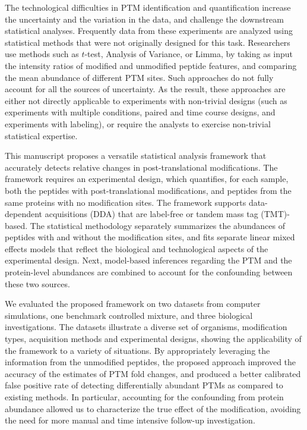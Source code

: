 \documentclass[mcp]{article}
\numberwithin{table}{section}
\begin{document}
The technological difficulties in PTM identification and quantification increase the uncertainty and the variation in the data, and challenge the downstream statistical analyses. Frequently data from these experiments are analyzed using statistical methods that were not originally designed for this task. Researchers use methods such as $t$-test\cite{Kalpic:2011}, Analysis of Variance\cite{girden:1992}, or Limma\cite{Ritchie_15a}, by taking as input the intensity ratios of modified and unmodified peptide features, and comparing the mean abundance of different PTM sites. Such approaches do not fully account for all the sources of uncertainty. As the result, these approaches are either not directly applicable to experiments with non-trivial designs (such as experiments with multiple conditions, paired and time course designs, and experiments with labeling), or require the analysts to exercise non-trivial statistical expertise.

This manuscript proposes a versatile statistical analysis framework that accurately detects relative changes in post-translational modifications. The framework requires an experimental design, which quantifies, for each sample, both the peptides with post-translational modifications, and peptides from the same proteins with no modification sites. The framework supports data-dependent acquisitions (DDA) that are label-free or tandem mass tag (TMT)-based. The statistical methodology separately summarizes the abundances of peptides with and without the modification sites, and fits separate linear mixed effects models that reflect the biological and technological aspects of the experimental design. Next, model-based inferences regarding the PTM and the protein-level abundances are combined to account for the confounding between these two sources.

We evaluated the proposed framework on two datasets from computer simulations, one benchmark controlled mixture, and three biological investigations. The datasets illustrate a diverse set of organisms, modification types, acquisition methods and experimental designs, showing the applicability of the framework to a variety of situations. By appropriately leveraging the information from the unmodified peptides, the proposed approach improved the accuracy of the estimates of PTM fold changes, and produced a better calibrated false positive rate of detecting differentially abundant PTMs as compared to existing methods. In particular, accounting for the confounding from protein abundance allowed us to characterize the true effect of the modification, avoiding the need for more manual and time intensive follow-up investigation.
\end{document}
